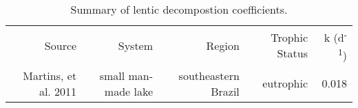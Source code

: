 \begin{table}
\label{tab:k_summary}
\begin{tabular}{r r r r r }
Source               & System              & Region              & Trophic Status & k (d\textsuperscript{-1}) \\
Martins, et al. 2011 & small man-made lake & southeastern Brazil & eutrophic      & 0.018 \\



\end{tabular}
\caption{Summary of lentic decompostion coefficients.}
\end{table}